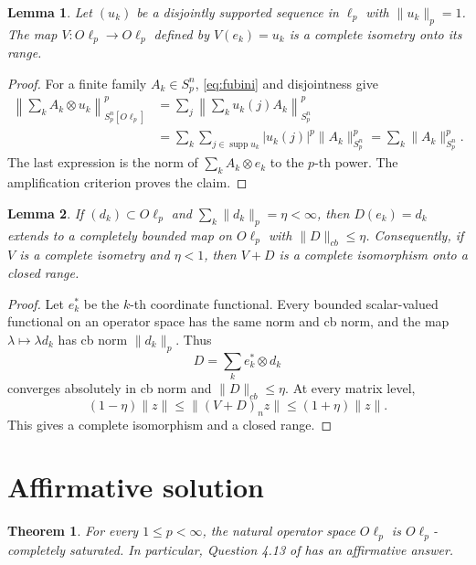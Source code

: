 \documentclass[11pt]{article}
\newtheorem{theorem}{Theorem}
\newtheorem{lemma}{Lemma}
\begin{document}
\begin{lemma}\label{lem:disjoint}
Let $(u_k)$ be a disjointly supported sequence in $\ell_p$ with
$\|u_k\|_p=1$. The map $V:O\ell_p\to O\ell_p$ defined by
$V(e_k)=u_k$ is a complete isometry onto its range.
\end{lemma}

\begin{proof}
For a finite family $A_k\in S_p^n$, \eqref{eq:fubini} and disjointness give
\begin{align*}
 \left\|\sum_k A_k\otimes u_k\right\|_{S_p^n[O\ell_p]}^p
 &=\sum_j\left\|\sum_k u_k(j)A_k\right\|_{S_p^n}^p\\
 &=\sum_k\sum_{j\in\operatorname{supp}u_k}
        |u_k(j)|^p\|A_k\|_{S_p^n}^p
 =\sum_k\|A_k\|_{S_p^n}^p.
\end{align*}
The last expression is the norm of $\sum_k A_k\otimes e_k$ to the
$p$-th power. The amplification criterion proves the claim.
\end{proof}

\begin{lemma}\label{lem:perturb}
If $(d_k)\subset O\ell_p$ and $\sum_k\|d_k\|_p=\eta<\infty$, then
$D(e_k)=d_k$ extends to a completely bounded map on $O\ell_p$ with
$\|D\|_{cb}\leq\eta$. Consequently, if $V$ is a complete isometry and
$\eta<1$, then $V+D$ is a complete isomorphism onto a closed range.
\end{lemma}

\begin{proof}
Let $e_k^*$ be the $k$-th coordinate functional. Every bounded scalar-valued
functional on an operator space has the same norm and cb norm, and the map
$\lambda\mapsto\lambda d_k$ has cb norm $\|d_k\|_p$. Thus
\[
 D=\sum_k e_k^*\otimes d_k
\]
converges absolutely in cb norm and $\|D\|_{cb}\leq\eta$. At every matrix
level,
\[
 (1-\eta)\|z\|\leq\|(V+D)_n z\|\leq(1+\eta)\|z\|.
\]
This gives a complete isomorphism and a closed range.
\end{proof}

\section{Affirmative solution}

\begin{theorem}\label{thm:main}
For every $1\leq p<\infty$, the natural operator space $O\ell_p$ is
$O\ell_p$-completely saturated. In particular, Question 4.13 of
\cite{source} has an affirmative answer.
\end{theorem}
\end{document}
